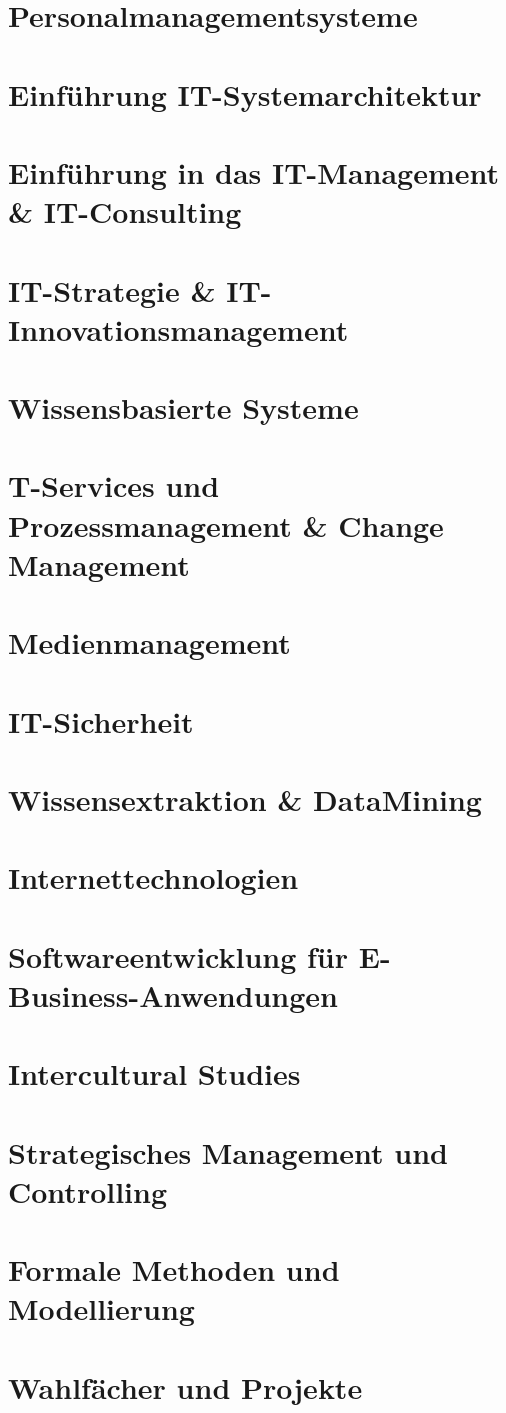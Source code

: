 \documentclass{hswbook}
\begin{document}
    \chapter{Personalmanagementsysteme}\label{chap:hrs}
    \chapter{Einführung IT-Systemarchitektur}\label{chap:itsys}
    \chapter{Einführung in das IT-Management \& IT-Consulting}\label{chap:itmgmt}
    \chapter{IT-Strategie \& IT-Innovationsmanagement }\label{chap:innovationsmgmt}
    \chapter{Wissensbasierte Systeme}\label{chap:wbs}
    \chapter{T-Services und Prozessmanagement \& Change Management}\label{chap:changemgmt}
    \chapter{Medienmanagement}\label{chap:medmgmt}
    \chapter{IT-Sicherheit}\label{chap:itsec}
    \chapter{Wissensextraktion \& DataMining}\label{chap:datamining}
    \chapter{Internettechnologien}\label{chap:it}
    \chapter{Softwareentwicklung für E-Business-Anwendungen}\label{chap:ebuissnes}
    \chapter{Intercultural Studies}\label{chap:ics}
    \chapter{Strategisches Management und Controlling}\label{chap:controlling}
    \chapter{Formale Methoden und Modellierung}\label{chap:softwaretest}
    \chapter{Wahlfächer und Projekte}\label{chap:sonst2}
\end{document}
